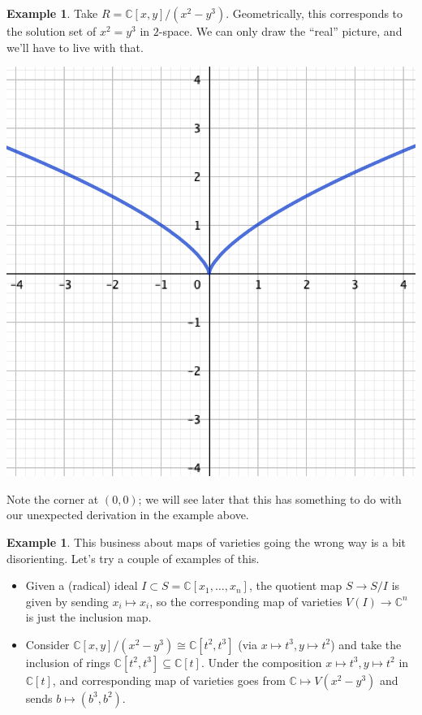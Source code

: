 \documentclass{amsart}[12pt]
\newcommand{\C}{\mathbb{C}}
\numberwithin{equation}{section}
\theoremstyle{plain} %
\theoremstyle{definition}
\newtheorem{ex}[equation]{Example}
\theoremstyle{remark}
\begin{document}
\begin{ex} Take $R=\C[x,y]/(x^2-y^3)$. 
Geometrically, this corresponds to the solution set of $x^2=y^3$ in $2$-space. We can only draw the ``real'' picture, and we'll have to live with that. 

\begin{center}
\includegraphics[scale=.5]{curve1}
\end{center}

Note the corner at $(0,0)$; we will see later that this has something to do with our unexpected derivation in the example above.
\end{ex}



\begin{ex} This business about maps of varieties going the wrong way is a bit disorienting. Let's try a couple of examples of this.
\begin{itemize}
\item Given a (radical) ideal $I \subset S=\C[x_1,\dots,x_n]$, the quotient map $S\to S/I$ is given by sending $x_i\mapsto x_i$, so the corresponding map of varieties $V(I)\to \C^n$ is just the inclusion map.
\item Consider $\C[x,y]/(x^2-y^3) \cong \C[t^2,t^3]$ (via $x\mapsto t^3, y\mapsto t^2$) and take the inclusion of rings $\C[t^2,t^3] \subseteq \C[t]$. Under the composition $x\mapsto t^3, y\mapsto t^2$ in $\C[t]$, and corresponding map of varieties goes from $\C\mapsto V(x^2-y^3)$ and sends $b\mapsto(b^3,b^2)$.
\end{itemize}
\end{ex}
\end{document}
